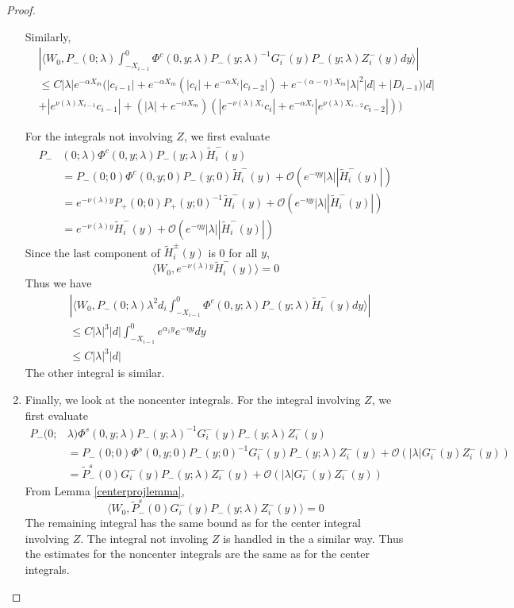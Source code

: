 \documentclass[thesis.tex]{subfiles}
\begin{document}
\begin{lemma}
\begin{proof}
\begin{enumerate}
Similarly,
\begin{align*}
&\left| \langle W_0, P_-(0; \lambda) \int_{-X_{i-1}}^0 \Phi^c(0, y; \lambda) P_-(y; \lambda)^{-1} G_i^-(y) P_-(y; \lambda)Z_i^-(y) dy \rangle \right| \\
&\leq C |\lambda| e^{-\alpha X_m} \Big(|c_{i-1}| + e^{-\alpha X_m}(|c_i| + e^{-\alpha X_i} |c_{i-2}|) + e^{-(\alpha - \eta) X_m}|\lambda|^2|d| + |D_{i-1})|d| \\
&+ |e^{\nu(\lambda)X_{i-1}}c_{i-1}| + (|\lambda| + e^{-\alpha X_m})(|e^{-\nu(\lambda)X_i} c_i| + e^{-\alpha X_i} |e^{\nu(\lambda)X_{i-2}} c_{i-2}|)\Big)
\end{align*}

For the integrals not involving $Z$, we first evaluate
\begin{align*}
P_-&(0; \lambda) \Phi^c(0, y; \lambda) P_-(y; \lambda) \tilde{H}_i^-(y) \\
&= P_-(0; 0) \Phi^c(0, y; 0) P_-(y; 0) \tilde{H}_i^-(y) + \mathcal{O}(e^{-\eta y}|\lambda||\tilde{H}_i^-(y)|) \\
&= e^{-\nu(\lambda) y} P_+(0; 0) P_+(y; 0)^{-1}\tilde{H}_i^-(y) + \mathcal{O}(e^{-\eta y}|\lambda||\tilde{H}_i^-(y)|)  \\
&= e^{-\nu(\lambda) y} \tilde{H}_i^-(y) + \mathcal{O}(e^{-\eta y}|\lambda||\tilde{H}_i^-(y)|) 
\end{align*}
Since the last component of $\tilde{H}_i^\pm(y)$ is 0 for all $y$,
\[
\langle W_0, e^{-\nu(\lambda) y} \tilde{H}_i^-(y) \rangle = 0
\]
Thus we have
\begin{align*}
&\left| \langle W_0, P_-(0; \lambda) \lambda^2 d_i \int_{-X_{i-1}}^0 \Phi^c(0, y; \lambda) P_-(y; \lambda) \tilde{H}_i^-(y) dy \rangle \right| \\
&\leq C |\lambda|^3 |d| \int_{-X_{i-1}}^0 e^{\alpha_1 y} e^{-\eta y} dy \\
&\leq C |\lambda|^3 |d| 
\end{align*}
The other integral is similar.

\item Finally, we look at the noncenter integrals. For the integral involving $Z$, we first evaluate 
\begin{align*}
P_-(0; &\lambda) \Phi^s(0, y; \lambda) P_-(y; \lambda)^{-1} G_i^-(y) P_-(y; \lambda)Z_i^-(y) \\
&= P_-(0; 0) \Phi^s(0, y; 0) P_-(y; 0)^{-1}G_i^-(y) P_-(y; \lambda)Z_i^-(y) + \mathcal{O}(|\lambda| G_i^-(y) Z_i^-(y)) \\
&= \tilde{P}_-^s(0)G_i^-(y) P_-(y; \lambda)Z_i^-(y) + \mathcal{O}(|\lambda| G_i^-(y) Z_i^-(y))
\end{align*}
From Lemma \ref{centerprojlemma},
\[
\langle W_0, \tilde{P}_-^s(0)G_i^-(y) P_-(y; \lambda)Z_i^-(y) \rangle = 0
\]
The remaining integral has the same bound as for the center integral involving $Z$. The integral not involing $Z$ is handled in the a similar way. Thus the estimates for the noncenter integrals are the same as for the center integrals.


\end{enumerate}
\end{proof}
\end{lemma}
\end{document}
